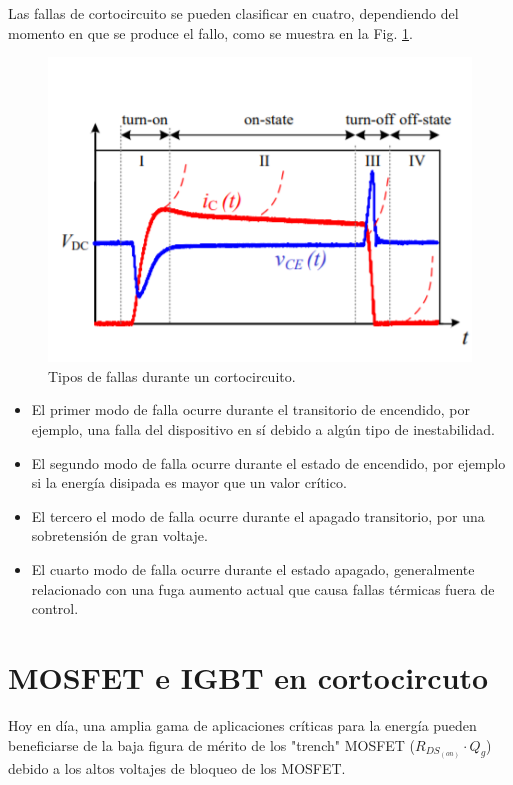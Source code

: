 \documentclass[conference]{IEEEtran}
\begin{document}
 Las fallas de cortocircuito se pueden clasificar en cuatro, dependiendo del momento en que se produce el fallo, como se muestra en la Fig. \ref{fig:sc2}. 
 
 \begin{figure}[H]
	\centering
	\includegraphics[width=\columnwidth]{imagenes/sc2}
	\caption{Tipos de fallas durante un cortocircuito. \cite{sc}}
	\label{fig:sc2}
\end{figure}
 
 \begin{itemize}
 \item  El primer modo de falla ocurre durante el transitorio de encendido, por ejemplo, una falla del dispositivo en sí debido a algún tipo de inestabilidad.
 \item El segundo modo de falla ocurre durante el estado de encendido, por ejemplo si la energía disipada es mayor que un valor crítico.
 \item El tercero el modo de falla ocurre durante el apagado transitorio, por una sobretensión de gran voltaje.
 \item El cuarto modo de falla ocurre durante el estado apagado, generalmente relacionado con una fuga aumento actual que causa fallas térmicas fuera de control.
 \end{itemize}
 


\section{MOSFET e IGBT en cortocircuto}
Hoy en día, una amplia gama de aplicaciones críticas para la energía pueden beneficiarse de la baja figura de mérito de los "trench"  MOSFET ($R_{DS_{(on)}} \cdot  Q_{g}$) debido a los altos voltajes de bloqueo de los MOSFET.
\end{document}
